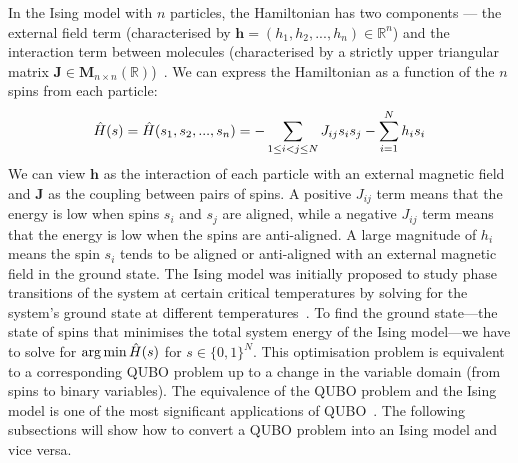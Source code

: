 In the Ising model with $n$ particles, the Hamiltonian has two components --- the external field term (characterised by $\mathbf{h} = (h_1, h_2, ..., h_n) \in \mathbb{R}^n$) and the interaction term between molecules (characterised by a strictly upper triangular matrix $\mathbf{J} \in \boldsymbol{M}_{n\times n}(\mathbb{R})$)~\cite{b10}. We can express the Hamiltonian as a function of the $n$ spins from each particle:
\begin{equation}
    \Hat{H}(s) = \Hat{H}(s_1, s_2, ... , s_n) = -\sum_{1\leq i < j \leq N} J_{ij}s_i s_j - \sum_{i=1}^N h_i s_i
\end{equation}
We can view $\mathbf{h}$ as the interaction of each particle with an external magnetic field and $\mathbf{J}$ as the coupling between pairs of spins. A positive $J_{ij}$ term means that the energy is low when spins $s_i$ and $s_j$ are aligned, while a negative $J_{ij}$ term means that the energy is low when the spins are anti-aligned. A large magnitude of $h_i$ means the spin $s_i$ tends to be aligned or anti-aligned with an external magnetic field in the ground state.
The Ising model was initially proposed to study phase transitions of the system at certain critical temperatures by solving for the system's ground state at different temperatures~\cite{isingising}. To find the ground state---the state of spins that minimises the total system energy of the Ising model---we have to solve for $ \operatorname*{arg\,min} \Hat{H}(s) $ for $ s \in \{ 0, 1 \}^N $. This optimisation problem is equivalent to a corresponding QUBO problem up to a change in the variable domain (from spins to binary variables). The equivalence of the QUBO problem and the Ising model is one of the most significant applications of QUBO~\cite{b5}. The following subsections will show how to convert a QUBO problem into an Ising model and vice versa.

